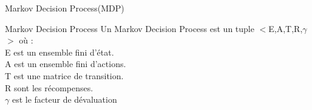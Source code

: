 \begin{frame}{Markov Decision Process(MDP)}{}
	\begin{center}
		\begin{block}{Markov Decision Process}
			Un Markov Decision Process est un tuple $<$E,A,T,R,$\gamma$$>$ où :\\
			E est un ensemble fini d'état.\\
			A est un ensemble fini d'actions.\\
			T est une matrice de transition.\\
			R sont les récompenses.\\
			$\gamma$ est le facteur de dévaluation
		\end{block}
	\end{center}
\end{frame}